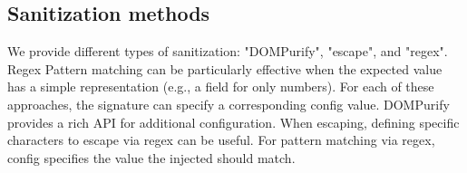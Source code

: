 \subsection{Sanitization methods}
We provide different types of sanitization: "DOMPurify", "escape", and "regex". Regex Pattern matching can be particularly effective when the expected value has a simple representation (e.g., a field for only numbers). For each of these approaches, the signature can specify a corresponding config value. DOMPurify provides a rich API for additional configuration. When escaping, defining specific characters to escape via regex can be useful. For pattern matching via regex, config specifies the value the injected should match.
